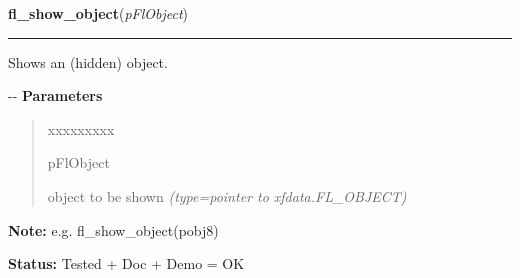     \vspace{0.5ex}

\hspace{.8\funcindent}\begin{boxedminipage}{\funcwidth}

    \raggedright \textbf{fl\_show\_object}(\textit{pFlObject})

    \vspace{-1.5ex}

    \rule{\textwidth}{0.5\fboxrule}
\setlength{\parskip}{2ex}

Shows an (hidden) object.

-{}-
\setlength{\parskip}{1ex}
      \textbf{Parameters}
      \vspace{-1ex}

      \begin{quote}
        \begin{Ventry}{xxxxxxxxx}

          \item[pFlObject]


object to be shown
            {\it (type=pointer to xfdata.FL\_OBJECT)}

        \end{Ventry}

      \end{quote}

\textbf{Note:} 
e.g. fl\_show\_object(pobj8)


\textbf{Status:} 
Tested + Doc + Demo = OK


    \end{boxedminipage}

    \label{xformslib:flbasic:fl_hide_object}

    \vspace{0.5ex}

